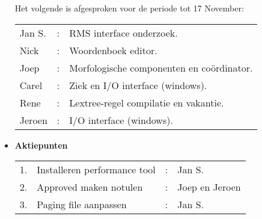 \begin{itemize}
 Het volgende is afgesproken voor de periode tot 17 November:\\
 \begin{tabular}{lcl}
  Jan S. &:&RMS interface onderzoek.                      \\
  Nick   &:&Woordenboek editor.                           \\
  Joep   &:&Morfologische componenten en co\"{o}rdinator. \\
  Carel  &:&Ziek en I/O interface (windows).              \\
  Rene   &:&Lextree-regel compilatie en vakantie.         \\
  Jeroen &:&I/O interface (windows).                      \\
 \end{tabular}
 \item {\bf Aktiepunten}\\
 \begin{tabular}{llcl}
  1.&Installeren performance tool&:&Jan S.\\
  2.&Approved maken notulen      &:&Joep en Jeroen\\
  3.&Paging file aanpassen       &:&Jan S.
 \end{tabular}
\end{itemize}

